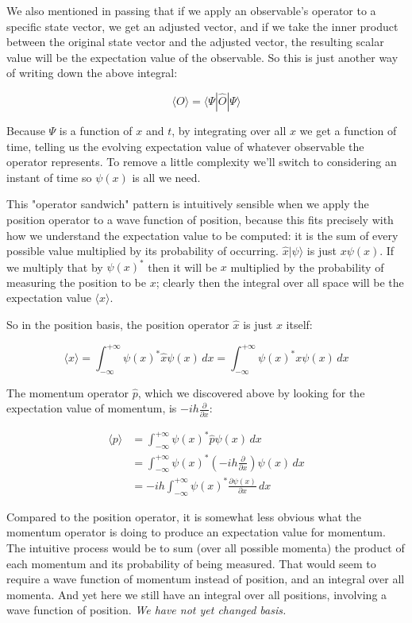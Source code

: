 We also mentioned in passing that if we apply an observable's operator to a specific state vector, we get an adjusted vector, and if we take the inner product between the original state vector and the adjusted vector, the resulting scalar value will be the expectation value of the observable. So this is just another way of writing down the above integral:

$$
\langle O \rangle =
\langle \Psi| \hat{O} | \Psi \rangle
$$

Because $\Psi$ is a function of $x$ and $t$, by integrating over all $x$ we get a function of time, telling us the evolving expectation value of whatever observable the operator represents. To remove a little complexity we'll switch to considering an instant of time so $\psi(x)$ is all we need.

This "operator sandwich" pattern is intuitively sensible when we apply the position operator to a wave function of position, because this fits precisely with how we understand the expectation value to be computed: it is the sum of every possible value multiplied by its probability of occurring. $\hat{x}|\psi\rangle$ is just $x \psi(x)$. If we multiply that by $\psi(x)^*$ then it will be $x$ multiplied by the probability of measuring the position to be $x$; clearly then the integral over all space will be the expectation value $\langle x \rangle$.

So in the position basis, the position operator $\hat{x}$ is just $x$ itself:

$$
\langle x \rangle =
\int_{-\infty}^{+\infty}
\psi(x)^*
\hat{x}
\psi(x)
\,dx
=
\int_{-\infty}^{+\infty}
\psi(x)^*
x
\psi(x)
\,dx
$$

The momentum operator $\hat{p}$, which we discovered above by looking for the expectation value of momentum, is $-ih\frac{\partial}{\partial x}$:

\begin{equation}
\begin{split}
  \langle p \rangle &=
  \int_{-\infty}^{+\infty}
  \psi(x)^*
  \hat{p}
  \psi(x)
  \,dx 
  \\
  &=
  \int_{-\infty}^{+\infty}
  \psi(x)^*
  (-ih\frac{\partial}{\partial x})
  \psi(x)
  \,dx 
  \\
  &= -ih
  \int_{-\infty}^{+\infty}
  \psi(x)^*
  \frac{\partial \psi(x)}{\partial x}
  \,dx  
\end{split}
\end{equation}

Compared to the position operator, it is somewhat less obvious what the momentum operator is doing to produce an expectation value for momentum. The intuitive process would be to sum (over all possible momenta) the product of each momentum and its probability of being measured. That would seem to require a wave function of momentum instead of position, and an integral over all momenta. And yet here we still have an integral over all positions, involving a wave function of position. \textit{We have not yet changed basis.}


